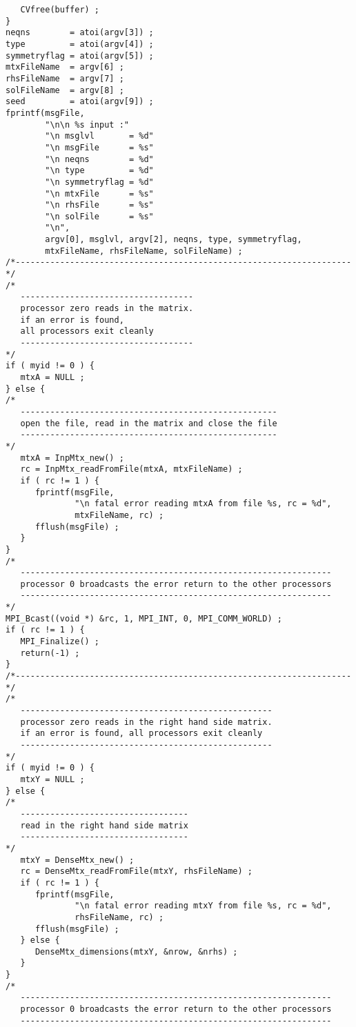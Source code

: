 \begin{verbatim}
   CVfree(buffer) ;
}
neqns        = atoi(argv[3]) ;
type         = atoi(argv[4]) ;
symmetryflag = atoi(argv[5]) ;
mtxFileName  = argv[6] ;
rhsFileName  = argv[7] ;
solFileName  = argv[8] ;
seed         = atoi(argv[9]) ;
fprintf(msgFile, 
        "\n\n %s input :"
        "\n msglvl       = %d"
        "\n msgFile      = %s"
        "\n neqns        = %d"
        "\n type         = %d"
        "\n symmetryflag = %d"
        "\n mtxFile      = %s"
        "\n rhsFile      = %s"
        "\n solFile      = %s"
        "\n",
        argv[0], msglvl, argv[2], neqns, type, symmetryflag,
        mtxFileName, rhsFileName, solFileName) ;
/*--------------------------------------------------------------------*/
/*
   -----------------------------------
   processor zero reads in the matrix.
   if an error is found, 
   all processors exit cleanly
   -----------------------------------
*/
if ( myid != 0 ) {
   mtxA = NULL ;
} else {
/*
   ----------------------------------------------------
   open the file, read in the matrix and close the file
   ----------------------------------------------------
*/
   mtxA = InpMtx_new() ;
   rc = InpMtx_readFromFile(mtxA, mtxFileName) ;
   if ( rc != 1 ) {
      fprintf(msgFile, 
              "\n fatal error reading mtxA from file %s, rc = %d",
              mtxFileName, rc) ;
      fflush(msgFile) ;
   }
}
/*
   ---------------------------------------------------------------
   processor 0 broadcasts the error return to the other processors
   ---------------------------------------------------------------
*/
MPI_Bcast((void *) &rc, 1, MPI_INT, 0, MPI_COMM_WORLD) ;
if ( rc != 1 ) {
   MPI_Finalize() ;
   return(-1) ;
}
/*--------------------------------------------------------------------*/
/*
   ---------------------------------------------------
   processor zero reads in the right hand side matrix.
   if an error is found, all processors exit cleanly
   ---------------------------------------------------
*/
if ( myid != 0 ) {
   mtxY = NULL ;
} else {
/*
   ----------------------------------
   read in the right hand side matrix
   ----------------------------------
*/
   mtxY = DenseMtx_new() ;
   rc = DenseMtx_readFromFile(mtxY, rhsFileName) ;
   if ( rc != 1 ) {
      fprintf(msgFile, 
              "\n fatal error reading mtxY from file %s, rc = %d",
              rhsFileName, rc) ;
      fflush(msgFile) ;
   } else {
      DenseMtx_dimensions(mtxY, &nrow, &nrhs) ;
   }
}
/*
   ---------------------------------------------------------------
   processor 0 broadcasts the error return to the other processors
   ---------------------------------------------------------------

\end{verbatim}

